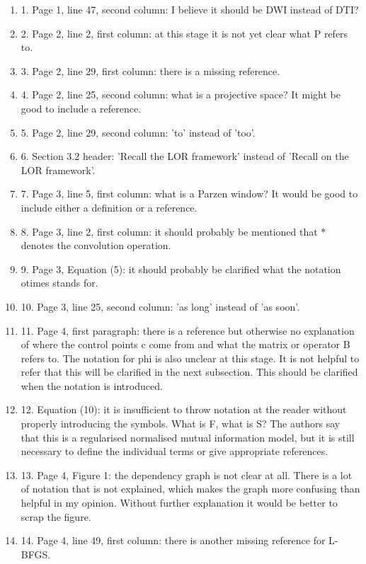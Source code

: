 \documentclass[11pt,a4paper]{article}
\begin{document}
\begin{enumerate}
    \item 
1. Page 1, line 47, second column: I believe it should be DWI instead of DTI?
\item 2. Page 2, line 2, first column: at this stage it is not yet clear what P refers to. 
\item 3. Page 2, line 29, first column: there is a missing reference.
\item 4. Page 2, line 25, second column: what is a projective space? It might be good to include a reference.
\item 5. Page 2, line 29, second column: 'to' instead of 'too'.
\item 6. Section 3.2 header: 'Recall the LOR framework' instead of 'Recall on the LOR framework'.
\item 7. Page 3, line 5, first column: what is a Parzen window? It would be good to include either a definition or a reference.
\item 8. Page 3, line 2, first column: it should probably be mentioned that * denotes the convolution operation.
\item 9. Page 3, Equation (5): it should probably be clarified what the notation \\otimes stands for.
\item 10. Page 3, line 25, second column: 'as long' instead of 'as soon'.
\item 11. Page 4, first paragraph: there is a reference but otherwise no explanation of where the control points c come from and what the matrix or operator B refers to. The notation for phi is also unclear at this stage. It is not helpful to refer that this will be clarified in the next subsection. This should be clarified when the notation is introduced.
\item 12. Equation (10): it is insufficient to throw notation at the reader without properly introducing the symbols. What is F, what is S? The authors say that this is a regularised normalised mutual information model, but it is still necessary to define the individual terms or give appropriate references.
\item 13. Page 4, Figure 1: the dependency graph is not clear at all. There is a lot of notation that is not explained, which makes the graph more confusing than helpful in my opinion. Without further explanation it would be better to scrap the figure.
\item 14. Page 4, line 49, first column: there is another missing reference for L-BFGS.

\end{enumerate}
\end{document}
